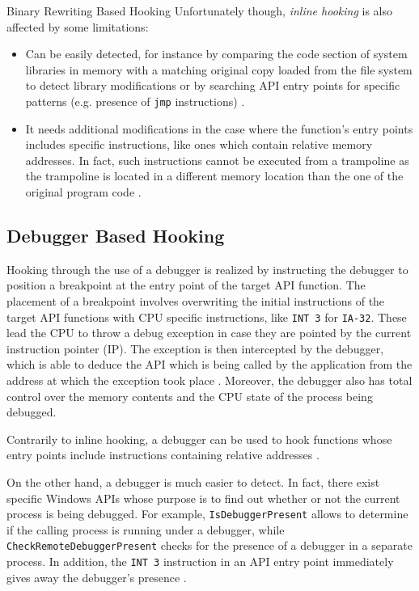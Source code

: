 \documentclass[binding=0.6cm,LaM,english,noexaminfo,oneside]{sapthesis} %
\begin{document}
\begin{section}{Binary Rewriting Based Hooking}
Unfortunately though, \textit{inline hooking} is also affected by some limitations:

\begin{itemize}
\item Can be easily detected, for instance by comparing the code section of system libraries in memory with a matching original copy loaded from the file system to detect library modifications \cite{Buescher:2011:BIS:2186328.2186347} or by searching API entry points for specific patterns (e.g. presence of \texttt{jmp} instructions) \cite{HookingDetection}.
\item It needs additional modifications in the case where the function's entry points includes specific instructions, like ones which contain relative memory addresses. In fact, such instructions cannot be executed from a trampoline as the trampoline is located in a different memory location than the one of the original program code \cite{Berdajs:2010:EAU:1815744.1815746}.
\end{itemize}

\subsection{Debugger Based Hooking}

Hooking through the use of a debugger is realized by instructing the debugger to position a breakpoint at the entry point of the target API function. The placement of a breakpoint involves overwriting the initial instructions of the target API functions with CPU specific instructions, like \texttt{INT 3} for \texttt{IA-32}. These lead the CPU to throw a debug exception in case they are pointed by the current instruction pointer (IP). The exception is then intercepted by the debugger, which is able to deduce the API which is being called by the application from the address at which the exception took place \cite{HookingDetection}. Moreover, the debugger also has total control over the memory contents and the CPU state of the process being debugged.

Contrarily to inline hooking, a debugger can be used to hook functions whose entry points include instructions containing relative addresses \cite{Berdajs:2010:EAU:1815744.1815746}.

On the other hand, a debugger is much easier to detect. In fact, there exist specific Windows APIs whose purpose is to find out whether or not the current process is being debugged. For example, \texttt{IsDebuggerPresent} allows to determine if the calling process is running under a debugger, while \texttt{CheckRemoteDebuggerPresent} checks for the presence of a debugger in a separate process. 
In addition, the \texttt{INT 3} instruction in an API entry point immediately gives away the debugger's presence \cite{HookingDetection}.
\end{section}
\end{document}
